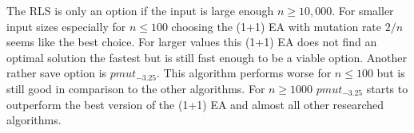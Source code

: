 

The RLS is only an option if the input is large enough $n \ge 10,000$. For smaller input sizes especially for $n \le 100$ choosing the (1+1) EA with mutation rate $2/n$ seems like the best choice. For larger values this (1+1) EA does not find an optimal solution the fastest but is still fast enough to be a viable option. Another rather save option is $pmut_{-3.25}$. This algorithm performs worse for $n \le 100$ but is still good in comparison to the other algorithms. For $n \ge 1000$ $pmut_{-3.25}$ starts to outperform the best version of the (1+1) EA and almost all other researched algorithms.
